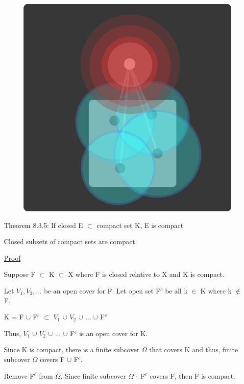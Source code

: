 \begin{figure}[h]
	\centering
	\includegraphics[scale=0.35]{Images/8.3.4.png}
\end{figure}

{ \color{red} Theorem 8.3.5: If closed E $\subset$ compact set K, E is compact } 

	\begin{adjustbox}{minipage=14cm, right, vspace=0.1cm 0cm}
		Closed subsets of compact sets are compact.
	\end{adjustbox}

{ \color{magenta} \underline{Proof} } 

	Suppose F $\subset$ K $\subset$ X where F is closed relative to X
	and K is compact.

	Let $V_1, V_2, ...$ be an open cover for F.
	Let open set F$^c$ be all k $\in$ K where k $\not \in$ F.

	\qquad K = F $\cup$ F$^c$ $\subset$ $V_1$ $\cup$ $V_2$ $\cup$ ... $\cup$ F$^c$

	Thus, $V_1$ $\cup$ $V_2$ $\cup$ ... $\cup$ F$^c$ is an open cover for K.

	Since K is compact, there is a finite subcover $\Omega$ that covers K
	and thus, finite subcover $\Omega$ covers F $\cup$ F$^c$.
	
	Remove F$^c$ from $\Omega$. Since finite subcover $\Omega$ - F$^c$ covers F,
	then F is compact. \\

